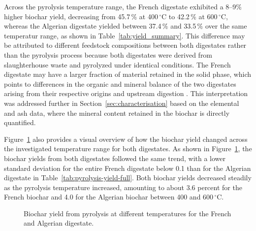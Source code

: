 Across the pyrolysis temperature range, the French digestate exhibited a 8--9\% higher biochar yield, decreasing from 45.7\,\% at 400\,$^{\circ}$C to 42.2\,\% at 600\,$^{\circ}$C, whereas the Algerian digestate yielded between 37.4\,\% and 33.5\,\% over the same temperatur range, as shown in Table~\ref{tab:yield_summary}. This difference may be attributed to different feedstock compositions between both digestates rather than the pyrolysis process because both digestates were derived from slaughterhouse waste and pyrolyzed under identical conditions. The French digestate may have a larger fraction of material retained in the solid phase, which points to differences in the organic and mineral balance of the two digestates arising from their respective origins and upstream digestion \cite{kujawska-2026,sarkar-2024}. This interpretation was addressed further in Section~\ref{sec:characterisation} based on the elemental and ash data, where the mineral content retained in the biochar is directly quantified.

\vspace{0.3em}

Figure~\ref{fig:pyrolysis-yield} also provides a visual overview of how the biochar yield changed across the investigated temperature range for both digestates. As shown in Figure~\ref{fig:pyrolysis-yield}, the biochar yields from both digestates followed the same trend, with a lower standard deviation for the entire French digestate below 0.1 than for the Algerian digestate in Table~\ref{tab:pyrolysis-yield-full}. Both biochar yields decreased steadily as the pyrolysis temperature increased, amounting to about 3.6 percent for the French biochar and 4.0 for the Algerian biochar between 400 and 600\,$^{\circ}$C.

\begin{figure}[ht]
\centering
{}
\caption{Biochar yield from pyrolysis at different temperatures for the French and
Algerian digestate.}
\label{fig:pyrolysis-yield}
\end{figure}


